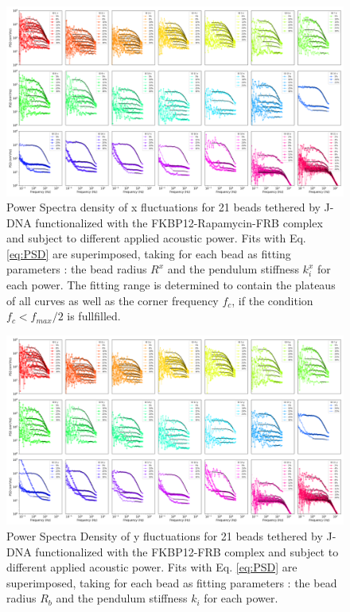 \documentclass{biophys-new}
\begin{document}
\begin{figure}
	\centering
	\centerline {\includegraphics[width=1\linewidth]{Figures/multispectrumx_Rapa.png}}
	\caption{Power Spectra density of x fluctuations for 21 beads tethered by J-DNA functionalized with the FKBP12-Rapamycin-FRB complex and subject to different applied acoustic power. Fits with Eq. \ref{eq:PSD} are superimposed, taking for each bead as fitting parameters : the bead radius $R^x$ and the pendulum stiffness $k^x_i$ for each power. The fitting range is determined to contain the plateaus of all curves as well as the corner frequency $f_c$, if the condition $f_c < f_{max}/2$ is fullfilled.}
	\label{fig:FitSpectra}
\end{figure}

\begin{figure}
	\centering
	\centerline {\includegraphics[width=1\linewidth]{Figures/multispectrumy_Rapa.png}}
	\caption{Power Spectra Density of y fluctuations for 21 beads tethered by J-DNA functionalized with the FKBP12-FRB complex and subject to different applied acoustic power. Fits with Eq. \ref{eq:PSD} are superimposed, taking for each bead as fitting parameters : the bead radius $R_b$ and the pendulum stiffness $k_i$ for each power.}
	\label{fig:FitSpectra_y}
\end{figure}
\end{document}
